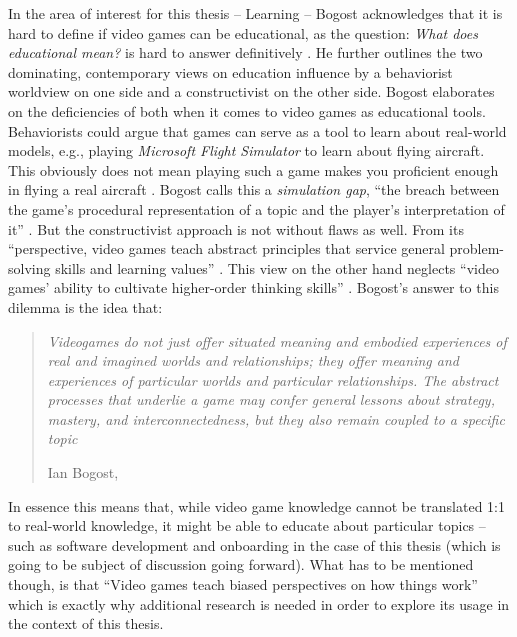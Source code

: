 In the area of interest for this thesis -- Learning -- Bogost acknowledges that it is hard to define if video games can be educational, as the question: \textit{What does educational mean?} is hard to answer definitively \cite[p. 233]{bogost2007persuasive}. He further outlines the two dominating, contemporary views on education influence by a behaviorist worldview on one side and a constructivist on the other side. Bogost elaborates on the deficiencies of both when it comes to video games as educational tools. Behaviorists could argue that games can serve as a tool to learn about real-world models, e.g., playing \textit{Microsoft Flight Simulator} to learn about flying aircraft. This obviously does not mean playing such a game makes you proficient enough in flying a real aircraft \cite[p. 238]{bogost2007persuasive}. Bogost calls this a \textit{simulation gap}, \enquote{the breach between the game's procedural representation of a topic and the player's interpretation of it} \cite[p. 238-239]{bogost2007persuasive}. But the constructivist approach is not without flaws as well. From its \enquote{perspective, video games teach abstract principles that service general problem-solving skills and learning values} \cite[p. 239]{bogost2007persuasive}. This view on the other hand neglects \enquote{video games’ ability to cultivate higher-order
  thinking skills} \cite[p. 240]{bogost2007persuasive}. Bogost's answer to this dilemma is the idea that:

\begin{quote}
  \textit{Videogames do not just offer situated meaning and embodied experiences of real and imagined worlds and relationships; they offer meaning and experiences of particular worlds and particular relationships. The abstract processes that underlie a game may confer general lessons about strategy, mastery, and interconnectedness, but they also remain coupled to a specific topic}

  \footnotesize{Ian Bogost, \cite[p. 241]{bogost2007persuasive}}
\end{quote}

In essence this means that, while video game knowledge cannot be translated 1:1 to real-world knowledge, it might be able to educate about particular topics -- such as software development and onboarding in the case of this thesis (which is going to be subject of discussion going forward). What has to be mentioned though, is that \enquote{Video games teach biased perspectives on how things work} \cite[p. 260]{bogost2007persuasive} which is exactly why additional research is needed in order to explore its usage in the context of this thesis.

